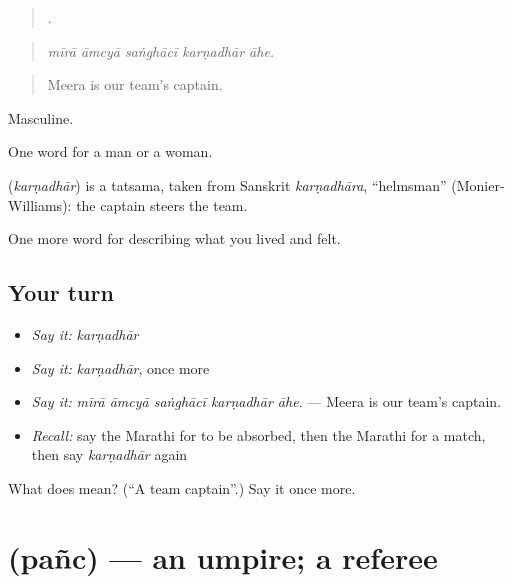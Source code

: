 \begin{quote}
    .
\end{quote}

\begin{quote}
\emph{mīrā āmcyā saṅghācī karṇadhār āhe.}
\end{quote}

\begin{quote}
Meera is our team's captain.
\end{quote}

Masculine.

One word for a man or a woman.

\begin{cousinweb}
\textbf{} (\emph{karṇadhār}) is a tatsama, taken from Sanskrit \emph{karṇadhāra}, \textquotedblleft{}helmsman\textquotedblright{} (Monier-Williams): the captain steers the team.
\end{cousinweb}

\begin{grammarlens}[title={What you've built}]
One more word for describing what you lived and felt.
\end{grammarlens}

\subsection*{Your turn}
\begin{itemize}
\raggedright
  \item \emph{Say it:} \emph{karṇadhār}
  \item \emph{Say it:} \emph{karṇadhār}, once more
  \item \emph{Say it:} \emph{mīrā āmcyā saṅghācī karṇadhār āhe.} — Meera is our team's captain.
  \item \emph{Recall:} say the Marathi for to be absorbed, then the Marathi for a match, then say \emph{karṇadhār} again
\end{itemize}

\begin{tcolorbox}[breakable,colback=teal!4,colframe=teal!35!black,title={Before you move on}]
What does  mean? (\textquotedblleft{}A team captain\textquotedblright{}.) Say it once more.
\end{tcolorbox}
\section[\texorpdfstring{\mr{पंच} (pañc)}{पंच (pañc)}]{ (pañc) — an umpire; a referee}

